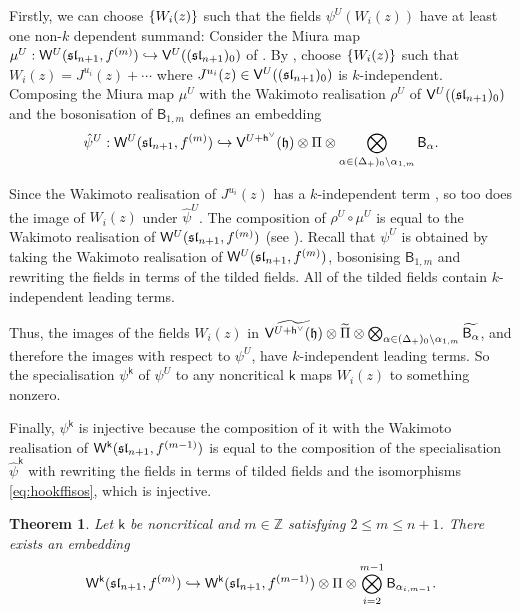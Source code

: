 \documentclass[10pt,a4paper]{amsart}
\numberwithin{equation}{section}
\newcommand{\kk}{\mathsf{k}}   %
\DeclarePairedDelimiter{\brac}{\lparen}{\rparen}   %
\DeclarePairedDelimiter{\set}{\lbrace}{\rbrace}
\newcommand{\fld}[1]{\mathbb{#1}}    %
\newcommand{\alg}[1]{\mathfrak{#1}}  %
\newcommand{\VOA}[1]{\mathsf{#1}}    %
\newcommand{\ZZ}{\fld{Z}}
\newcommand{\SLA}[2]{\alg{#1}_{#2}}                      %
\newcommand{\slnpone}{\SLA{sl}{n+1}}
\newcommand{\cartan}{\mathfrak{h}}
\newcommand{\cox}{\mathsf{h}}                                        %
\newcommand{\dcox}{\coroot{\cox}}                                    %
\newcommand{\proots}{\Delta_+}                                       %
\newcommand{\sroot}[1]{\alpha_{#1}}                                  %
\newcommand{\coroot}[1]{#1^{\vee}}                                   %
\newcommand{\fhook}[1]{f^{(#1)}}                                  %
\newcommand{\Wsymb}{\VOA{W}}
\newcommand{\uaffvoa}[2]{\VOA{V}^{#1}\brac{#2}}                   %
\newcommand{\bgvoa}{\VOA{B}}                                      %
\newcommand{\uQHR}[3]{\Wsymb^{#1}\brac{#2,#3}}                    %
\theoremstyle{plain}
\newtheorem{theorem}{Theorem}[section]
\begin{document}
Firstly, we can choose $\set{W_i(z)}$ such that the fields $\psi^U(W_i(z))$ have at least one non-$k$ dependent summand: Consider the Miura map $\mu^U: \uQHR{U}{\slnpone}{\fhook{m}} \hookrightarrow \uaffvoa{U}{(\slnpone)_0}$ of \cite{KacQua03}. By \cite[Thm.~4.1]{KacQua04}, choose $\set{W_i(z)}$ such that $W_i(z) = J^{u_i}(z) + \cdots$ where $J^{u_i}(z) \in \uaffvoa{U}{(\slnpone)_0}$ is $k$-independent. Composing the Miura map $\mu^U$ with the Wakimoto realisation $\rho^U$ of $\uaffvoa{U}{(\slnpone)_0}$ and the bosonisation of $\bgvoa_{1,m}$ defines an embedding
%
\begin{equation}
    \hat{\psi}^U: \uQHR{U}{\slnpone}{\fhook{m}} \hookrightarrow \uaffvoa{U+\dcox}{\cartan} \otimes \Pi \otimes \bigotimes_{\alpha \in (\proots)_0 \setminus \alpha_{1,m}} \bgvoa_{\alpha}.
\end{equation}

Since the Wakimoto realisation of $J^{u_i}(z)$ has a $k$-independent term \cite{Fre05Opers}, so too does the image of $W_i(z)$ under $\hat{\psi}^U$. The composition of $\rho^U \circ \mu^U$ is equal to the Wakimoto realisation of $\uQHR{U}{\slnpone}{\fhook{m}}$ (see \cite[Sec.~4.5]{GenScreen20}). Recall that $\psi^U$ is obtained by taking the Wakimoto realisation of $\uQHR{U}{\slnpone}{\fhook{m}}$, bosonising $\bgvoa_{1,m}$ and rewriting the fields in terms of the tilded fields. All of the tilded fields contain $k$-independent leading terms.

Thus, the images of the fields $W_i(z)$ in $\widetilde{\uaffvoa{U+\dcox}{\cartan}}  \otimes \widetilde{\Pi} \otimes \bigotimes_{\alpha \in (\proots)_0 \setminus \alpha_{1,m}} \widetilde{\bgvoa_{\alpha}}$, and therefore the images with respect to $\psi^U$, have $k$-independent leading terms. So the specialisation $\psi^{\kk}$ of $\psi^U$ to any noncritical $\kk$ maps $W_i(z)$ to something nonzero.

Finally, $\psi^\kk$ is injective because the composition of it with the Wakimoto realisation of $\uQHR{\kk}{\slnpone}{\fhook{m-1}}$ is equal to the composition of the specialisation $\hat{\psi}^\kk$ with rewriting the fields in terms of tilded fields and the isomorphisms \eqref{eq:hookffisos}, which is injective. 

\begin{theorem} \label{thm:HookToHookNogen}
Let $\kk$ be noncritical and $m \in \ZZ$ satisfying $2 \leq m \leq n+1$. There exists an embedding 
%
\begin{equation} \label{eq:HooksFromHooks}
    \uQHR{\kk}{\slnpone}{\fhook{m}} \hookrightarrow \uQHR{\kk}{\slnpone}{\fhook{m-1}} \otimes \Pi \otimes \bigotimes_{i=2}^{m-1} \bgvoa_{\sroot{i,m-1}}.
\end{equation}
%
\end{theorem}
\end{document}
